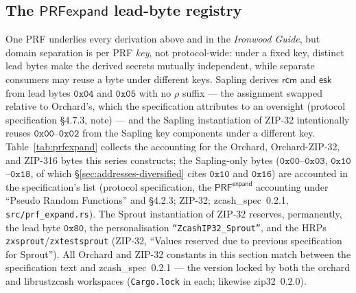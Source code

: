 \documentclass[11pt,a4paper]{article}
\theoremstyle{definition}
\newcommand{\rcm}{\ensuremath{\mathsf{rcm}}}
\begin{document}
\subsection{The $\mathsf{PRFexpand}$ lead-byte registry}\label{sec:zip32-registry}

One PRF underlies every derivation above and in the \emph{Ironwood Guide},
but domain separation is per PRF \emph{key}, not protocol-wide: under a
fixed key, distinct lead bytes make the derived secrets mutually
independent, while separate consumers may reuse a byte under different
keys. Sapling derives $\rcm$ and $\mathsf{esk}$ from lead bytes
$\mathtt{0x04}$ and $\mathtt{0x05}$ with no $\rho$ suffix --- the
assignment swapped relative to Orchard's, which the specification
attributes to an oversight (protocol specification \S4.7.3, note) --- and
the Sapling
instantiation of ZIP-32 intentionally reuses
$\mathtt{0x00}$--$\mathtt{0x02}$ from the Sapling key components under a
different key. Table~\ref{tab:prfexpand} collects the accounting for the
Orchard, Orchard-ZIP-32, and ZIP-316 bytes this series constructs; the
Sapling-only bytes ($\mathtt{0x00}$--$\mathtt{0x03}$,
$\mathtt{0x10}$--$\mathtt{0x18}$, of which
\S\ref{sec:addresses-diversified} cites $\mathtt{0x10}$ and
$\mathtt{0x16}$) are accounted in the specification's list (protocol
specification, the $\mathsf{PRF}^{\mathsf{expand}}$ accounting under
``Pseudo Random Functions'' and \S4.2.3; ZIP-32;
\textsf{zcash\_spec}~0.2.1, \texttt{src/prf\_expand.rs}). The Sprout
instantiation of ZIP-32 reserves,
permanently, the lead byte $\mathtt{0x80}$, the personalisation
\texttt{``ZcashIP32\_Sprout''}, and the HRPs
\texttt{zxsprout}/\texttt{zxtestsprout} (ZIP-32, ``Values reserved due to
previous specification for Sprout''). All Orchard and ZIP-32 constants in
this section match between the specification text and
\textsf{zcash\_spec}~0.2.1 --- the version locked by both the
\textsf{orchard} and \textsf{librustzcash} workspaces
(\texttt{Cargo.lock} in each; likewise \textsf{zip32}~0.2.0).
\end{document}
